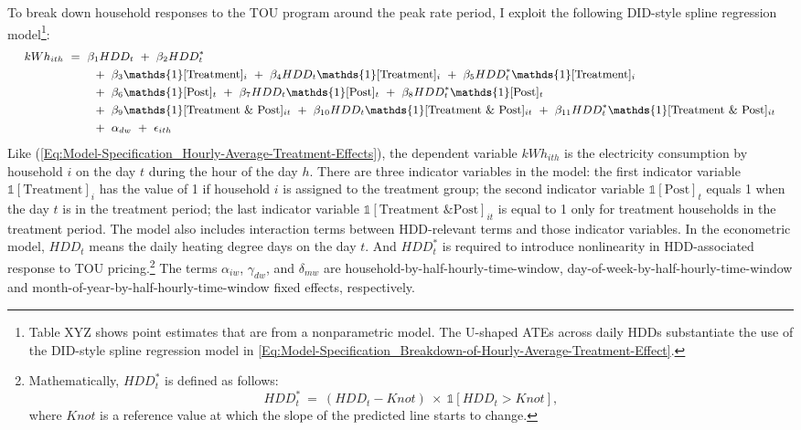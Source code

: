 To break down household responses to the TOU program around the peak rate period, I exploit the following DID-style spline regression model\footnote{Table XYZ shows point estimates that are from a nonparametric model. The U-shaped ATEs across daily HDDs substantiate the use of the DID-style spline regression model in \ref{Eq:Model-Specification_Breakdown-of-Hourly-Average-Treatment-Effect}.}:
\begin{equation}
\small
\begin{split}
    kWh_{ith} \ 
    & = \ \beta_{1} HDD_{t} \ + \ \beta_{2} HDD_{t}^{*} \\
    & \hspace{0.7cm} + \ \beta_{3} \mathds{1}[\text{Treatment}]_{i} \ + \ \beta_{4} HDD_{t} \mathds{1}[\text{Treatment}]_{i} \ + \ \beta_{5} HDD_{t}^{*} \mathds{1}[\text{Treatment}]_{i} \\
    & \hspace{0.7cm} + \ \beta_{6} \mathds{1}[\text{Post}]_{t} \ + \ \beta_{7} HDD_{t} \mathds{1}[\text{Post}]_{t} \ + \ \beta_{8} HDD_{t}^{*} \mathds{1}[\text{Post}]_{t} \\
    & \hspace{0.7cm} + \ \beta_{9} \mathds{1}[\text{Treatment \& Post}]_{it} \ + \ \beta_{10} HDD_{t} \mathds{1}[\text{Treatment \& Post}]_{it} \ + \ \beta_{11} HDD_{t}^{*} \mathds{1}[\text{Treatment \& Post}]_{it} \\
    & \hspace{0.7cm} + \ \alpha_{dw} \ + \ \epsilon_{ith}
\end{split}
\label{Eq:Model-Specification_Breakdown-of-Hourly-Average-Treatment-Effect}
\end{equation}
Like (\ref{Eq:Model-Specification_Hourly-Average-Treatment-Effects}), the dependent variable $kWh_{ith}$ is the electricity consumption by household $i$ on the day $t$ during the hour of the day $h$. There are three indicator variables in the model: the first indicator variable $\mathbb{1}[\text{Treatment}]_{i}$ has the value of 1 if household $i$ is assigned to the treatment group; the second indicator variable $\mathbb{1}[\text{Post}]_{t}$ equals 1 when the day $t$ is in the treatment period; the last indicator variable $\mathbb{1}[\text{Treatment \& Post}]_{it}$ is equal to 1 only for treatment households in the treatment period. The model also includes interaction terms between HDD-relevant terms and those indicator variables. In the econometric model, $HDD_{t}$ means the daily heating degree days on the day $t$. And $HDD_{t}^{*}$ is required to introduce nonlinearity in HDD-associated response to TOU pricing.\footnote{Mathematically, $HDD_{t}^{*}$ is defined as follows:
\begin{equation*}
    HDD_{t}^{*} \ = \ (HDD_{t} - Knot) \ \times \ \mathbb{1}[HDD_{t} > Knot],
\end{equation*}
where $Knot$ is a reference value at which the slope of the predicted line starts to change.
} The terms $\alpha_{iw}$, $\gamma_{dw}$, and $\delta_{mw}$ are household-by-half-hourly-time-window, day-of-week-by-half-hourly-time-window and month-of-year-by-half-hourly-time-window fixed effects, respectively. 

